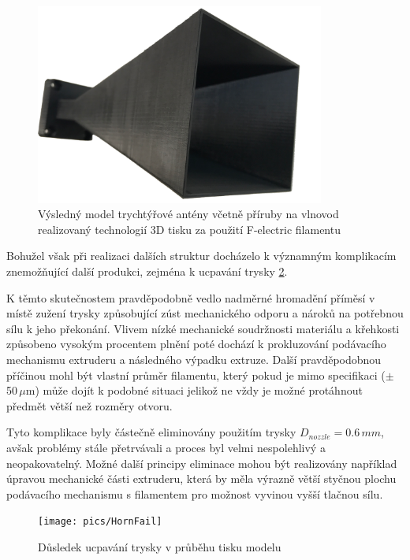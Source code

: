 \begin{figure}[h]
\begin{center}
\includegraphics[width=9.5cm]{pics/HornReal}
\caption{Výsledný model trychtýřové antény včetně příruby na vlnovod realizovaný technologií 3D tisku za použití F-electric filamentu}
\label{fig:HornRealFe}
\end{center}
\end{figure}

Bohužel však při realizaci dalších struktur docházelo k významným komplikacím znemožňující další produkci, zejména k ucpavání trysky \ref{fig:HornFail}.

K těmto skutečnostem pravděpodobně vedlo nadměrné hromadění příměsí v místě zužení trysky způsobující zúst mechanického odporu a nároků na potřebnou sílu k jeho překonání. Vlivem nízké mechanické soudržnosti materiálu a křehkosti způsobeno vysokým procentem plnění poté dochází k prokluzování podávacího mechanismu extruderu a následného výpadku extruze. Další pravděpodobnou příčinou mohl být vlastní průměr filamentu, který pokud je mimo specifikaci ($\pm$50\,$\mu$m) může dojít k podobné situaci jelikož ne vždy je možné protáhnout předmět větší než rozměry otvoru. 

Tyto komplikace byly částečně eliminovány použitím trysky $D_{nozzle} = 0.6\,mm$, avšak problémy stále přetrvávali a proces byl velmi nespolehlivý a neopakovatelný. Možné další principy eliminace mohou být realizovány například úpravou mechanické části extruderu, která by měla výrazně větší styčnou plochu podávacího mechanismu s filamentem pro možnost vyvinou vyšší tlačnou sílu.

\begin{figure}[h]
\begin{center}
\texttt{[image: pics/HornFail]}
\caption{Důsledek ucpavání trysky v průběhu tisku modelu}
\label{fig:HornFail}
\end{center}
\end{figure}


